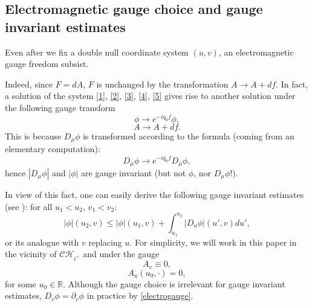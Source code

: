\documentclass[10pt,a4paper]{article}
\theoremstyle{plain}
\theoremstyle{remark}
\theoremstyle{definition}
\newcommand{\RR}{\mathbb{R}}
\theoremstyle{plain}
\theoremstyle{remark}
\theoremstyle{definition}
\newcommand{\CH}{\mathcal{CH}_{i^+}}
\numberwithin{equation}{section}
\begin{document}



\subsection{Electromagnetic gauge choice and gauge invariant estimates}

Even after we fix a double null coordinate system $(u,v)$, an electromagnetic gauge freedom subsist. 

Indeed, since $F=dA$, $F$ is unchanged by the transformation $ A \rightarrow  A+ d f$. In fact, a solution of the system \eqref{1}, \eqref{2}, \eqref{3}, \eqref{4}, \eqref{5} gives rise to another solution under the following gauge transform  $$ \phi \rightarrow  e^{-i q_0 f } \phi ,$$ $$ A \rightarrow  A+ d f.$$ This is because $D_{\mu} \phi$ is transformed according to the formula (coming from an elementary computation): $$ D_{\mu} \phi \rightarrow e^{-i q_0 f }  D_{\mu}\phi,$$ hence $|D_{\mu} \phi|$ and $|\phi|$ are gauge invariant (but not $\phi$, nor $D_{\mu} \phi$!). 

In view of this fact, one can easily derive the following gauge invariant estimates (see \cite{Moi2}):  for all $u_1<u_2$, $v_1<v_2$: $$ |\phi|(u_2,v) \leq |\phi|(u_1,v)+ \int_{u_1}^{u_2} |D_u \phi|(u',v) du',$$
or its analogue with $v$ replacing $u$. For simplicity, we will work in this paper in the vicinity of $\CH$ and under the gauge \begin{equation} \label{electrogauge}
A_v \equiv 0,
\end{equation}\begin{equation} \label{electrogauge2}
A_u(u_0,\cdot) = 0,
\end{equation} for some $u_0 \in \RR$. %
Although the gauge choice is irrelevant for gauge invariant estimates, $ D_v \phi = \partial_v \phi$ in practice by \eqref{electrogauge}. \color{black}%
\end{document}
